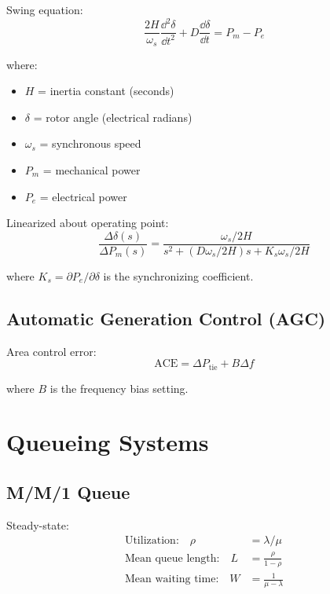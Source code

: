 Swing equation:
\begin{equation}
\frac{2H}{\omega_s}\frac{\dd^2\delta}{\dd t^2} + D\frac{\dd\delta}{\dd t} = P_m - P_e
\end{equation}

where:
\begin{itemize}
    \item $H$ = inertia constant (seconds)
    \item $\delta$ = rotor angle (electrical radians)
    \item $\omega_s$ = synchronous speed
    \item $P_m$ = mechanical power
    \item $P_e$ = electrical power
\end{itemize}

Linearized about operating point:
\begin{equation}
\frac{\Delta\delta(s)}{\Delta P_m(s)} = \frac{\omega_s/2H}{s^2 + (D\omega_s/2H)s + K_s\omega_s/2H}
\end{equation}

where $K_s = \partial P_e/\partial\delta$ is the synchronizing coefficient.

\subsection{Automatic Generation Control (AGC)}

Area control error:
\begin{equation}
\text{ACE} = \Delta P_{\text{tie}} + B\Delta f
\end{equation}

where $B$ is the frequency bias setting.

\section{Queueing Systems}
\label{sec:queueing}

\subsection{M/M/1 Queue}



Steady-state:
\begin{align}
\text{Utilization:} \quad \rho &= \lambda/\mu \\
\text{Mean queue length:} \quad L &= \frac{\rho}{1-\rho} \\
\text{Mean waiting time:} \quad W &= \frac{1}{\mu - \lambda}
\end{align}

